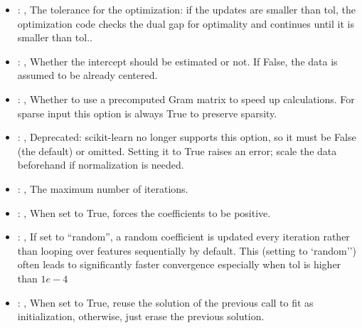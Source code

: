 \begin{itemize}
    \item {}: ,
      The tolerance for the optimization: if the updates are smaller
      than tol, the optimization code checks the dual gap for optimality and
      continues until it is smaller than tol..

    \item {}: ,
      Whether the intercept should be estimated or not. If False,
      the data is assumed to be already centered.

    \item {}: ,
      Whether to use a precomputed Gram matrix to speed up calculations.
      For sparse input this option is always True to preserve sparsity.

    \item {}: ,
      Deprecated: scikit-learn no longer supports this option, so it must be False (the default) or
      omitted.                                                  Setting it to True raises an error;
      scale the data beforehand if normalization is needed.

    \item {}: ,
      The maximum number of iterations.

    \item {}: ,
      When set to True, forces the coefficients to be positive.

    \item {}: ,
      If set to ``random'', a random coefficient is updated every iteration
      rather than looping over features sequentially by default. This (setting to `random'')
      often leads to significantly faster convergence especially when tol is higher than $1e-4$

    \item {}: ,
      When set to True, reuse the solution of the previous call
      to fit as initialization, otherwise, just erase the previous solution.
  \end{itemize}


